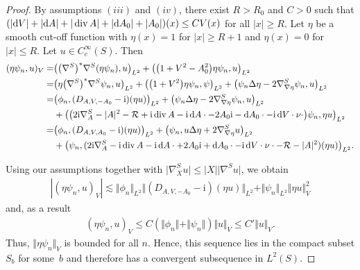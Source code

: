 \documentclass[pdftex]{sigma}
\numberwithin{equation}{section}
\begin{document}
\begin{proof}
By assumptions $(iii)$ and $(iv)$, there exist $R>R_0$ and $C>0$ such that $(|{\rm d}V| + |{\rm d}A| + |\operatorname{div} A|+|{\rm d}A_0| +|A_0|)(x)\leq C {V}(x)$ for all $|x|\geq R$. Let $\eta$ be a smooth cut-off function with $\eta(x)=1$ for $|x|\geq R+1$ and $\eta(x)=0$ for $|x|\leq R$. Let $u\in C_c^\infty(S)$. Then	
\begin{align*}
(\eta \psi_n, u)_{V} =&\bigl(\bigl(\nabla^S\bigr)^* \nabla^S (\eta \psi_n), u\bigr)_{L^2}+ \bigl(\bigl(1+V^2-A_0^2\bigr)\eta\psi_n, u\bigr)_{L^2}\\	
=&\bigl(\eta \bigl(\nabla^S\bigr)^* \nabla^S \psi_n, u\bigr)_{L^2}+ \bigl(\bigl(1+V^2\bigr)\eta\psi_n, \psi\bigr)_{L^2}+ \bigl(\psi_n  \Delta \eta -2 \nabla^S_{\nabla\eta} \psi_n, u\bigr)_{L^2}\\
=&\bigl(\phi_n, (D_{A,V,-A_0} -\mathrm{i})(\eta u)\bigr)_{L^2}+ \bigl(\psi_n \Delta \eta - 2 \nabla^S_{\nabla \eta} \psi_n,u\bigr)_{L^2}\\
&+\bigl(\bigl(2{\mathrm{i}}  \nabla^S_A -  |A|^2 -  \mathcal{R} + \mathrm{i}  \operatorname{div} A -  {\mathrm{i}} \, {\rm d}A\cdot -2A_0\mathrm{i}  -{\rm d}A_0\cdot - {\mathrm{i}} \, {\rm d}V \cdot  \nu\cdot \bigr) \psi_n, \eta u\bigr)_{L^2}\\
=&\bigl(\phi_n, (D_{A,V,A_0} -\mathrm{i})(\eta u)\bigr)_{L^2}+ \bigl( \psi_n ,u  \Delta \eta + 2 \nabla^S_{\nabla \eta} u\bigr)_{L^2}\\
&+\bigl(\psi_n, (2{\mathrm{i}}  \nabla^S_A - \mathrm{i}  \operatorname{div} A-  {\mathrm{i}}\,  {\rm d}A \cdot +2A_0\mathrm{i}  + {\rm d}A_0\cdot - {\mathrm{i}}  \, {\rm d}V \cdot  \nu \cdot  - \mathcal{R} -  |A|^2) (\eta u)\bigr)_{L^2}.
\end{align*}
	
Using our assumptions together with $\bigl| \nabla^S_X u\bigr|\leq |X|\bigl| \nabla^S u\bigr|$, we obtain
\begin{align*}
|(\eta \psi_n, u)_{V}| \lesssim \Vert \phi_n\Vert_{L^2}\Vert (D_{A,V,-A_0} -\mathrm{i})(\eta u)\Vert_{L^2} + \Vert \psi_n\Vert_{L^2} \Vert \eta u \Vert_{V}^2
\end{align*}
and, as a result
\begin{align*}
(\eta \psi_n, u)_{V} \leq C(\Vert \phi_n\Vert +\Vert \psi_n\Vert )\Vert u\Vert_{V}\leq C' \Vert u\Vert_{V}.
\end{align*}
Thus, $\Vert \eta \psi_n\Vert_{V}$ is bounded for all $n$. Hence, this sequence lies in the compact subset $S_b$ for some~$b$ and therefore has a convergent subsequence in $L^2(S)$.
\end{proof}
\end{document}

